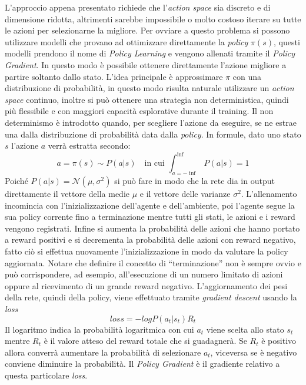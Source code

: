L'approccio appena presentato richiede che l'\emph{action space} sia discreto e di dimensione ridotta, altrimenti sarebbe impossibile o molto costoso iterare su tutte le azioni per selezionarne la migliore.
Per ovviare a questo problema si possono utilizzare modelli che provano ad ottimizzare direttamente la \emph{policy} $\pi(s)$, questi modelli prendono il nome di \emph{Policy Learning} e vengono allenati tramite il \emph{Policy Gradient}. %
In questo modo è possibile ottenere direttamente l'azione migliore a partire soltanto dallo stato.
L'idea principale è approssimare $\pi$ con una distribuzione di probabilità, in questo modo risulta naturale utilizzare un \emph{action space} continuo, inoltre si può ottenere una strategia non deterministica, quindi più flessibile e con maggiori capacità esplorative durante il training.
Il non determinismo è introdotto quando, per scegliere l'azione da eseguire, se ne estrae una dalla distribuzione di probabilità data dalla \emph{policy}.
In formule, dato uno stato $s$ l'azione $a$ verrà estratta secondo:
$$
a = 
\pi(s) \sim P(a|s) \quad\textrm{in cui } \int_{a = - \inf}^{\inf} P(a | s) = 1
$$
Poiché $P(a|s)  = \mathcal{N}(\mu,\sigma ^2)$ si può fare in modo che la rete dia in output direttamente il vettore della medie $\mu$ e il vettore delle varianze $\sigma^2$.
L'allenamento incomincia con l'inizializzazione dell'agente e dell'ambiente, poi l'agente segue la sua policy corrente fino a terminazione mentre tutti gli stati, le azioni e i reward vengono registrati.
Infine si aumenta la probabilità delle azioni che hanno portato a reward positivi e si decrementa la probabilità delle azioni con reward negativo, fatto ciò si effettua nuovamente l'inizializzazione in modo da valutare la policy aggiornata. 
Notare che definire il concetto di ``terminazione'' non è sempre ovvio e può corrispondere, ad esempio, all'esecuzione di un numero limitato di azioni oppure al ricevimento di un grande reward negativo.
L'aggiornamento dei pesi della rete, quindi della policy, viene effettuato tramite \emph{gradient descent} usando la \emph{loss}
$$
loss = - log P(a_t | s_t ) R_t
$$
Il logaritmo indica la probabilità logaritmica con cui $a_t$ viene scelta allo stato $s_t$ mentre $R_t$ è il valore atteso del reward totale che si guadagnerà.
Se $R_t$ è positivo allora converrà aumentare la probabilità di selezionare $a_t$, viceversa se è negativo conviene diminuire la probabilità.
Il \emph{Policy Gradient} è il gradiente relativo a questa particolare \emph{loss}.
